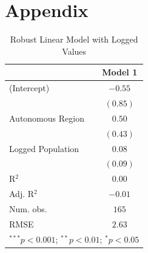 \documentclass[12pt]{article}
\begin{document}





\nocite{*}



\section{Appendix}
\begin{table}[htp]
\begin{center}
\begin{tabular}{l c}
\hline
 & Model 1 \\
\hline
(Intercept)         & $-0.55$  \\
                    & $(0.85)$ \\
Autonomous Region   & $0.50$   \\
                    & $(0.43)$ \\
Logged Population   & $0.08$   \\
                    & $(0.09)$ \\
\hline
R$^2$               & $0.00$   \\
Adj. R$^2$          & $-0.01$  \\
Num. obs.           & $165$    \\
RMSE                & $2.63$   \\
\hline
\multicolumn{2}{l}{\scriptsize{$^{***}p<0.001$; $^{**}p<0.01$; $^{*}p<0.05$}}
\end{tabular}
\caption{Robust Linear Model with Logged Values}
\end{center}
\end{table}




\end{document}
